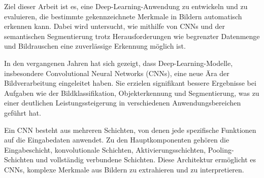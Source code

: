 Ziel dieser Arbeit ist es, eine Deep-Learning-Anwendung zu entwickeln und zu evaluieren, die bestimmte gekennzeichnete Merkmale in Bildern automatisch erkennen kann. Dabei wird untersucht, wie mithilfe von CNNs und der semantischen Segmentierung trotz Herausforderungen wie begrenzter Datenmenge und Bildrauschen eine zuverlässige Erkennung möglich ist.

 In den vergangenen Jahren hat sich gezeigt, dass Deep-Learning-Modelle, insbesondere Convolutional Neural Networks (CNNs), eine neue Ära der Bildverarbeitung eingeleitet haben. Sie erzielen signifikant bessere Ergebnisse bei Aufgaben wie der Bildklassifikation, Objekterkennung und Segmentierung, was zu einer deutlichen Leistungssteigerung in verschiedenen Anwendungsbereichen geführt hat.\cite{minaee_image_2022}

Ein CNN besteht aus mehreren Schichten, von denen jede spezifische Funktionen auf die Eingabedaten anwendet. Zu den Hauptkomponenten gehören die Eingabeschicht, konvolutionale Schichten, Aktivierungsschichten, Pooling-Schichten und vollständig verbundene Schichten. Diese Architektur ermöglicht es CNNs, komplexe Merkmale aus Bildern zu extrahieren und zu interpretieren.\cite{jogin_feature_2018}
